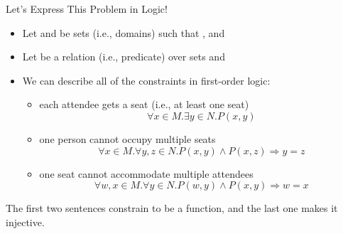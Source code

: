 \documentclass{beamer}
\begin{document}
\begin{frame}{Let's Express This Problem in Logic!}
  \begin{itemize}
  \item Let  and  be sets (i.e., \alert{domains}) such that , and 
  \item Let  be a relation (i.e., \alert{predicate}) over sets  and 
  \item We can describe all of the constraints in first-order logic:
    \begin{itemize}
    \item \pause each attendee gets a seat (i.e., at least one seat)
      \[
      \forall x \in M. \exists y \in N. P(x, y)
      \]
    \item \pause one person cannot occupy multiple seats
      \[
      \forall x \in M. \forall y, z \in N. P(x, y) \land P(x, z) \Rightarrow y=z
      \]
    \item \pause one seat cannot accommodate multiple attendees
      \[
      \forall w, x \in M. \forall y \in N. P(w, y) \land P(x, y) \Rightarrow w=x
      \]
    \end{itemize}
  \end{itemize}
  \pause
  The first two sentences constrain  to be a function, and the last one makes it injective.
\end{frame}
\end{document}
